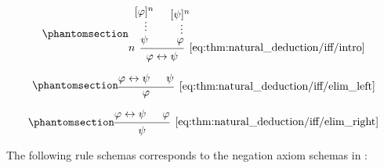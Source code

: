 \begin{proposition}
\begin{thmenum}
    \begin{minipage}{0.3\textwidth}
      \begin{equation*}\taglabel[\textrm{R} \( \leftrightarrow^+ \)]{eq:thm:natural_deduction/iff/intro}
        \begin{prooftree}
          \hypo{ [\varphi]^n }
          \ellipsis {} { \psi }
          \hypo{ [\psi]^n }
          \ellipsis {} { \varphi }
          \infer[left label=\( n \)]2[\ref{eq:thm:natural_deduction/iff/intro}]{ \varphi \leftrightarrow \psi }
        \end{prooftree}
      \end{equation*}
    \end{minipage}
    \hfill
    \begin{minipage}{0.3\textwidth}
      \begin{equation*}\taglabel[\textrm{R} \( \leftrightarrow_L^- \)]{eq:thm:natural_deduction/iff/elim_left}
        \begin{prooftree}
          \hypo{ \varphi \leftrightarrow \psi }
          \hypo{ \psi }
          \infer2[\ref{eq:thm:natural_deduction/iff/elim_left}]{ \varphi }
        \end{prooftree}
      \end{equation*}
    \end{minipage}
    \hfill
    \begin{minipage}{0.3\textwidth}
      \begin{equation*}\taglabel[\textrm{R} \( \leftrightarrow_R^- \)]{eq:thm:natural_deduction/iff/elim_right}
        \begin{prooftree}
          \hypo{ \varphi \leftrightarrow \psi }
          \hypo{ \varphi }
          \infer2[\ref{eq:thm:natural_deduction/iff/elim_right}]{ \psi }
        \end{prooftree}
      \end{equation*}
    \end{minipage}

     The following rule schemas corresponds to the negation axiom schemas in :


\end{thmenum}
\end{proposition}
